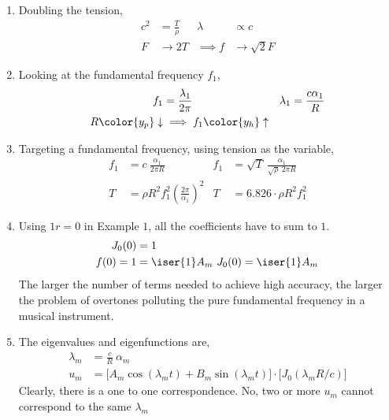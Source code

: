 \begin{enumerate}
    \item Doubling the tension,
          \begin{align}
              c^2 & = \frac{T}{\rho} & \lambda    & \propto c     \\
              F   & \to 2T           & \implies f & \to \sqrt{2}F
          \end{align}

    \item Looking at the fundamental frequency $ f_1 $,
          \begin{align}
              f_1                     & = \frac{\lambda_1}{2\pi}         &
              \lambda_1               & = \frac{c\alpha_1}{R}              \\
              R \color{y_p}\downarrow & \implies f_1 \color{y_h}\uparrow
          \end{align}

    \item Targeting a fundamental frequency, using tension as the variable,
          \begin{align}
              f_1 & = c\ \frac{\alpha_1}{2\pi R}                            &
              f_1 & = \sqrt{T}\ \frac{\alpha_1}{\sqrt{\rho}\ 2\pi R}          \\
              T   & = \rho R^2 f_1^2 \left( \frac{2\pi}{\alpha_1} \right)^2 &
              T   & = 6.826 \cdot \rho R^2 f_1^2
          \end{align}

    \item Using $1 r = 0 $ in Example $ 1 $, all the coefficients have to sum to $ 1 $.
          \begin{align}
              J_0(0)   & = 1                                   \\
              f(0) = 1 & = \iser{1} A_m\ J_0(0) = \iser{1} A_m
          \end{align}
          The larger the number of terms needed to achieve high accuracy, the larger the
          problem of overtones polluting the pure fundamental frequency in a musical
          instrument.

    \item The eigenvalues and eigenfunctions are,
          \begin{align}
              \lambda_m & = \frac{c}{R}\ \alpha_m                                   \\
              u_m       & = \Big[A_m \cos(\lambda_m t) + B_m \sin(\lambda_m t)\Big]
              \cdot \Big[J_0(\lambda_m R/c)\Big]
          \end{align}
          Clearly, there is a one to one correspondence. \textcolor{y_p}{No}, two or more
          $ u_m $ cannot correspond to the same $ \lambda_m $


\end{enumerate}
